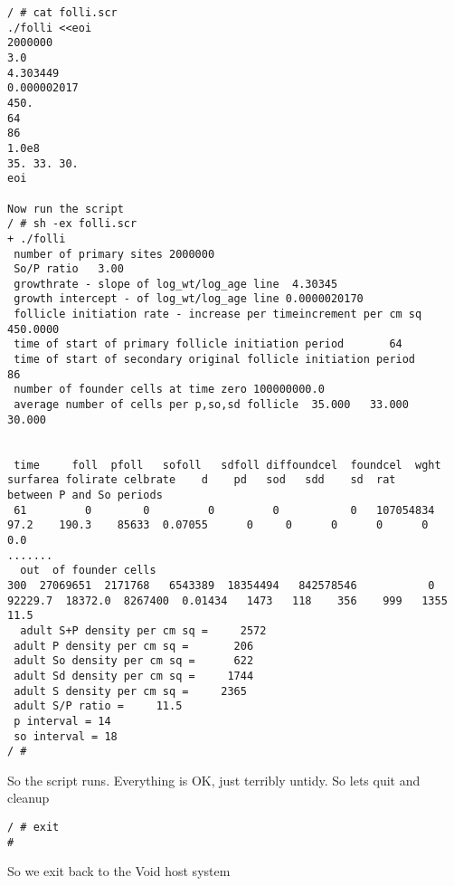 \documentclass{article}  %
\begin{document}
\begin{verbatim}
/ # cat folli.scr
./folli <<eoi
2000000
3.0
4.303449
0.000002017
450.
64
86
1.0e8
35. 33. 30.
eoi

Now run the script
/ # sh -ex folli.scr
+ ./folli
 number of primary sites 2000000
 So/P ratio   3.00
 growthrate - slope of log_wt/log_age line  4.30345
 growth intercept - of log_wt/log_age line 0.0000020170
 follicle initiation rate - increase per timeincrement per cm sq 450.0000
 time of start of primary follicle initiation period       64
 time of start of secondary original follicle initiation period       86
 number of founder cells at time zero 100000000.0
 average number of cells per p,so,sd follicle  35.000   33.000   30.000 


 time     foll  pfoll   sofoll   sdfoll diffoundcel  foundcel  wght surfarea folirate celbrate    d    pd   sod   sdd    sd  rat
between P and So periods
 61         0        0         0         0           0   107054834     97.2    190.3    85633  0.07055      0     0      0      0      0   0.0
.......
  out  of founder cells 
300  27069651  2171768   6543389  18354494   842578546           0  92229.7  18372.0  8267400  0.01434   1473   118    356    999   1355  11.5
  adult S+P density per cm sq =     2572
 adult P density per cm sq =       206
 adult So density per cm sq =      622
 adult Sd density per cm sq =     1744
 adult S density per cm sq =     2365
 adult S/P ratio =     11.5
 p interval = 14
 so interval = 18
/ # 
\end{verbatim}
 So the script runs. Everything is OK, just terribly untidy.
So lets quit and cleanup
\begin{verbatim}
/ # exit
# 
\end{verbatim}
 So we exit back to the Void host system
\end{document}

